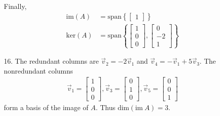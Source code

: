 \documentclass[letterpaper,12pt]{article}
\begin{document}
\begin{enumerate}
    Finally,
    \begin{align*}
      \text{im}(A) &= \text{span}\left\{
        \begin{bmatrix}
          1
        \end{bmatrix}
      \right\} \\
      \text{ker}(A) &= \text{span}\left\{
        \begin{bmatrix}
          1 \\ 0 \\ 0
        \end{bmatrix},
        \begin{bmatrix}
          0 \\ -2 \\ 1
        \end{bmatrix}
      \right\}
    \end{align*}
  \item[16.]
    The redundant columns are $\vec{v}_2 = -2\vec{v}_1$ and $\vec{v}_4 = -\vec{v}_1 + 5\vec{v}_3$. The nonredundant columns
    \begin{align*}
      \vec{v}_1 = \begin{bmatrix}
        1 \\ 0 \\ 0
      \end{bmatrix},
      \vec{v}_3 = \begin{bmatrix}
        0 \\ 1 \\ 0
      \end{bmatrix},
      \vec{v}_5 = \begin{bmatrix}
        0 \\ 0 \\ 1
      \end{bmatrix}
    \end{align*}
    form a basis of the image of $A$. Thus $\text{dim}(\text{im} \ A) = 3$.


\end{enumerate}
\end{document}
